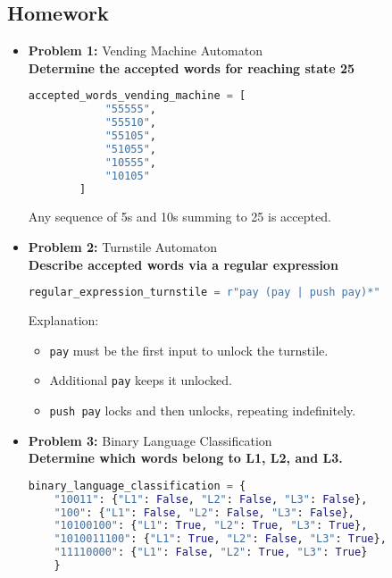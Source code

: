 \documentclass[11pt]{article}
\begin{document}
\subsection{Homework}
\begin{itemize}[leftmargin=*]
    \item \textbf{Problem 1:} Vending Machine Automaton
    \\ \textbf{Determine the accepted words for reaching state 25} 

    \begin{lstlisting}[language=Python]
        accepted_words_vending_machine = [
            "55555",
            "55510",
            "55105",
            "51055",
            "10555",
            "10105"
        ]
        \end{lstlisting}
        
        Any sequence of 5s and 10s summing to 25 is accepted.
    
    \item \textbf{Problem 2:} Turnstile Automaton
    \\ \textbf{Describe accepted words via a regular expression} 

    \begin{lstlisting}[language=Python]
        regular_expression_turnstile = r"pay (pay | push pay)*"
        \end{lstlisting}
        
        Explanation:
        \begin{itemize}
            \item \texttt{pay} must be the first input to unlock the turnstile.
            \item Additional \texttt{pay} keeps it unlocked.
            \item \texttt{push pay} locks and then unlocks, repeating indefinitely.
        \end{itemize}
        
    \item \textbf{Problem 3:} Binary Language Classification
    \\ \textbf{Determine which words belong to L1, L2, and L3.}

    \begin{lstlisting}[language=Python]
    binary_language_classification = {
    "10011": {"L1": False, "L2": False, "L3": False},
    "100": {"L1": False, "L2": False, "L3": False},
    "10100100": {"L1": True, "L2": True, "L3": True},
    "1010011100": {"L1": True, "L2": False, "L3": True},
    "11110000": {"L1": False, "L2": True, "L3": True}
    }
    \end{lstlisting}


\end{itemize}
\end{document}
